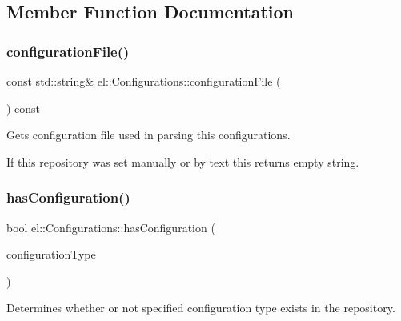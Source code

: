\subsection{Member Function Documentation}
\mbox{\label{classel_1_1_configurations_a65c89530cf6276fa91c02b00be76b3db}} 
\subsubsection{\texorpdfstring{configuration\+File()}{configurationFile()}}
{\footnotesize\ttfamily const std\+::string\& el\+::\+Configurations\+::configuration\+File (\begin{DoxyParamCaption}\item[{void}]{ }\end{DoxyParamCaption}) const\hspace{0.3cm}{\ttfamily [inline]}}



Gets configuration file used in parsing this configurations. 

If this repository was set manually or by text this returns empty string. \mbox{\label{classel_1_1_configurations_a1e812370f896b6429bf46b31fcd4e3e0}} 
\subsubsection{\texorpdfstring{has\+Configuration()}{hasConfiguration()}\hspace{0.1cm}{\footnotesize\ttfamily [1/2]}}
{\footnotesize\ttfamily bool el\+::\+Configurations\+::has\+Configuration (\begin{DoxyParamCaption}\item[{\hyperlink{namespaceel_a281f5db6d6163678bc68a8b23b59e124}{Configuration\+Type}}]{configuration\+Type }\end{DoxyParamCaption})\hspace{0.3cm}{\ttfamily [inline]}}



Determines whether or not specified configuration type exists in the repository. 


